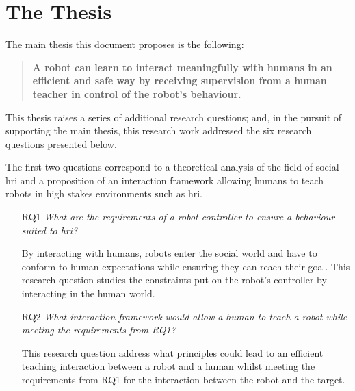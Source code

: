 

\section{The Thesis}\label{sec:intro_thesis}
The main thesis this document proposes is the following:
\begin{quote}
	\textbf{A robot can learn to interact meaningfully with humans in an efficient and safe way by receiving supervision from a human teacher in control of the robot's behaviour.}
\end{quote}

This thesis raises a series of additional research questions; and, in the pursuit of supporting the main thesis, this research work addressed the six research questions presented below.

The first two questions correspond to a theoretical analysis of the field of social \gls{hri} and a proposition of an interaction framework allowing humans to teach robots in high stakes environments such as \gls{hri}.

\begin{itemize}
	\item [RQ1] \emph{What are the requirements of a robot controller to ensure a behaviour suited to \gls{hri}?} 
	
		By interacting with humans, robots enter the social world and have to conform to human expectations while ensuring they can reach their goal. This research question studies the constraints put on the robot's controller by interacting in the human world. 
		
    \item [RQ2] \emph{What interaction framework would allow a human to teach a robot while meeting the requirements from RQ1?}
    
    	This research question address what principles could lead to an efficient teaching interaction between a robot and a human whilst meeting the requirements from RQ1 for the interaction between the robot and the target. 
\end{itemize}    	

